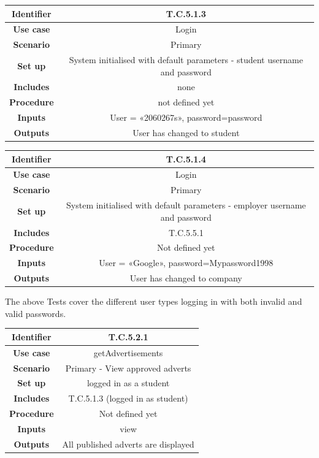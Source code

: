 \documentclass{l3deliverable}
\begin{document}
\begin{tabular}{|c|c|}
\hline \textbf{Identifier} & T.C.5.1.3\\
\hline \textbf{Use case} & Login \\
\hline \textbf{Scenario} & Primary\\
\hline \textbf{Set up} & System initialised with default parameters - student username and password\\
\hline \textbf{Includes} & none\\
\hline \textbf{Procedure} & not defined yet\\
\hline \textbf{Inputs} & User = «2060267s», password=password\\
\hline \textbf{Outputs} & User has changed to student\\
\hline
\end{tabular}

\begin{tabular}{|c|c|}
\hline \textbf{Identifier} & T.C.5.1.4 \\
\hline \textbf{Use case} & Login \\
\hline \textbf{Scenario} & Primary\\
\hline \textbf{Set up} & System initialised with default parameters - employer username and password\\
\hline \textbf{Includes} & T.C.5.5.1\\
\hline \textbf{Procedure} & Not defined yet\\
\hline \textbf{Inputs} & User = «Google», password=Mypassword1998\\
\hline \textbf{Outputs} & User has changed to company\\
\hline
\end{tabular}

The above Tests cover the different user types logging in with both invalid and valid passwords.\\ 

\begin{tabular}{|c|c|}
\hline \textbf{Identifier} & T.C.5.2.1 \\
\hline \textbf{Use case} & getAdvertisements\\
\hline \textbf{Scenario} & Primary - View approved adverts\\
\hline \textbf{Set up} & logged in as a student\\
\hline \textbf{Includes} & T.C.5.1.3 (logged in as student)\\
\hline \textbf{Procedure} & Not defined yet\\
\hline \textbf{Inputs} & view\\
\hline \textbf{Outputs} & All published adverts are displayed\\
\hline
\end{tabular}
\end{document}
